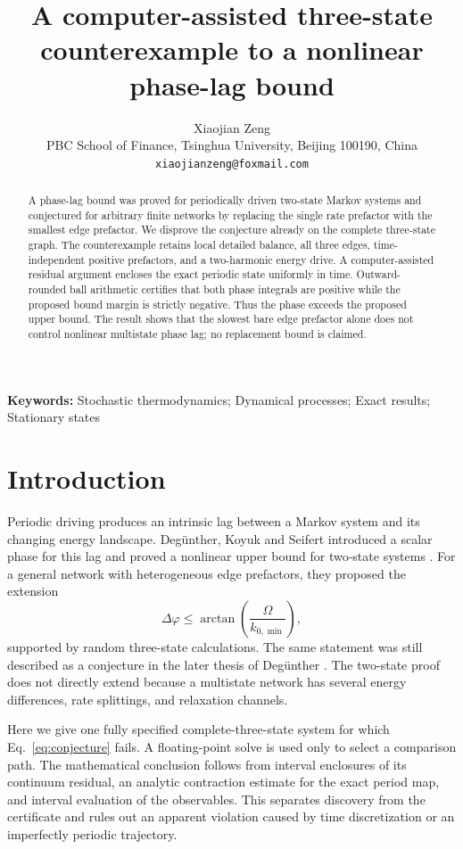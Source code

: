 \documentclass[11pt]{article}
\title{A computer-assisted three-state counterexample to a nonlinear phase-lag bound}
\author{Xiaojian Zeng\\
\small PBC School of Finance, Tsinghua University, Beijing 100190, China\\
\small \texttt{xiaojianzeng@foxmail.com}}
\date{}
\begin{document}
\maketitle

\begin{abstract}
A phase-lag bound was proved for periodically driven two-state Markov systems and
conjectured for arbitrary finite networks by replacing the single rate prefactor with
the smallest edge prefactor.  We disprove the conjecture already on the complete
three-state graph.  The counterexample retains local detailed balance, all three
edges, time-independent positive prefactors, and a two-harmonic energy drive.  A
computer-assisted residual argument encloses the exact periodic state uniformly in
time.  Outward-rounded ball arithmetic certifies that both phase integrals are
positive while the proposed bound margin is strictly negative.  Thus the phase
exceeds the proposed upper bound.  The result shows that the slowest bare edge
prefactor alone does not control nonlinear multistate phase lag; no replacement bound
is claimed.
\end{abstract}

\noindent\textbf{Keywords:} Stochastic thermodynamics; Dynamical processes; Exact
results; Stationary states

\section{Introduction}

Periodic driving produces an intrinsic lag between a Markov system and its changing
energy landscape.  Deg\"unther, Koyuk and Seifert introduced a scalar phase for this
lag and proved a nonlinear upper bound for two-state systems
\cite{deguenther2022phase}.  For a general network with heterogeneous edge
prefactors, they proposed the extension
\begin{equation}
  \Delta\varphi\leq \arctan\!\left(\frac{\Omega}{k_{0,\min}}\right),
  \label{eq:conjecture}
\end{equation}
supported by random three-state calculations.  The same statement was still described
as a conjecture in the later thesis of Deg\"unther
\cite{deguenther2024bounds}.  The two-state proof does not directly extend because a
multistate network has several energy differences, rate splittings, and relaxation
channels.

Here we give one fully specified complete-three-state system for which
Eq.~\eqref{eq:conjecture} fails.  A floating-point solve is used only to select a
comparison path.  The mathematical conclusion follows from interval enclosures of
its continuum residual, an analytic contraction estimate for the exact period map,
and interval evaluation of the observables.  This separates discovery from the
certificate and rules out an apparent violation caused by time discretization or an
imperfectly periodic trajectory.
\end{document}
